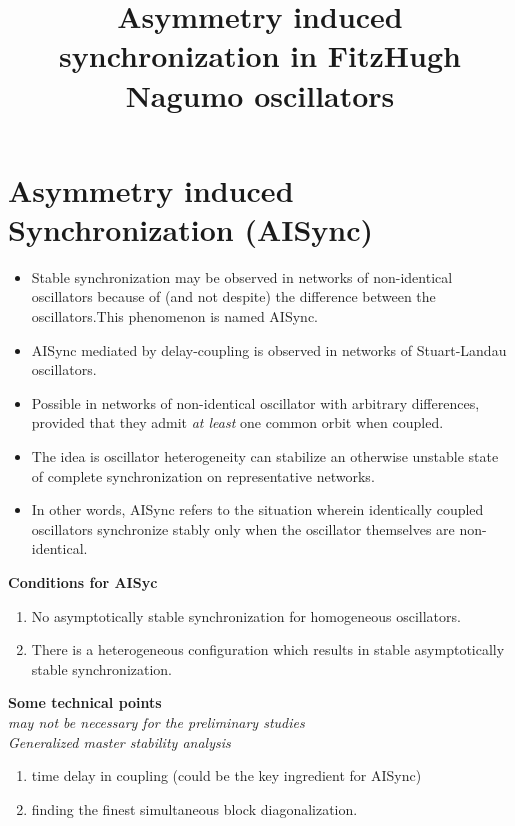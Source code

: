 \documentclass[paper=a4, fontsize=12pt]{scrartcl} %
\date{}
\date{}
\title{Asymmetry induced synchronization in FitzHugh Nagumo oscillators}
\begin{document}
    \maketitle
\section*{Asymmetry induced Synchronization (AISync)}
\begin{itemize}
    \item Stable synchronization may be observed in networks of non-identical 
    oscillators because of (and not despite) the difference between the 
    oscillators.This phenomenon is named AISync.
    \item AISync mediated by delay-coupling is observed in networks of 
    Stuart-Landau oscillators.
    \item  Possible in networks of non-identical oscillator with arbitrary 
    differences, provided that they admit {\it at least} one common orbit when 
    coupled.
    \item The idea is oscillator heterogeneity can stabilize an otherwise 
    unstable state of complete synchronization on representative networks.
    \item In other words, AISync refers to the situation wherein identically 
    coupled oscillators synchronize stably only when the oscillator themselves 
    are non-identical.
\end{itemize}

\noindent \textbf{Conditions for AISyc}
	\begin{enumerate}[label=(\Alph*)]
		\item No asymptotically stable synchronization for homogeneous oscillators. 
		
		\item There is a heterogeneous configuration which results in stable asymptotically stable synchronization. 
	\end{enumerate}

\noindent \textbf{Some technical points}\\
{\it may not be necessary for the preliminary studies}\\
{\it Generalized master stability analysis}

\begin{enumerate}[label=(\alph*)]
	\item time delay in coupling (could be the key ingredient for AISync)
	\item finding the finest simultaneous block diagonalization.
\end{enumerate}
\end{document}
